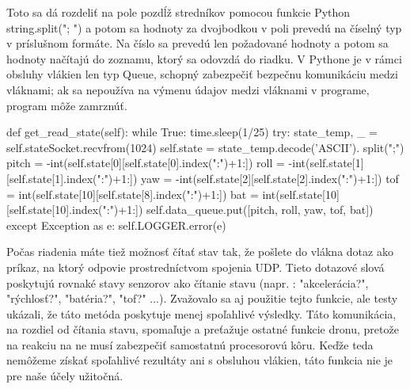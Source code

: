 {Toto sa dá rozdeliť na pole pozdĺž stredníkov pomocou funkcie Python string.split("; ") a potom sa hodnoty za dvojbodkou v poli prevedú na číselný typ v príslušnom formáte. Na číslo sa prevedú len požadované hodnoty a potom sa hodnoty načítajú do zoznamu, ktorý sa odovzdá do riadku. V Pythone je v rámci obsluhy vlákien len typ Queue, schopný zabezpečiť bezpečnu komunikáciu medzi vláknami; ak sa nepoužíva na výmenu údajov medzi vláknami v programe, program môže zamrznúť. 
\begin{mypython}[caption={Funkcia na čítanie stavov dronov },label=CL-2]
def get_read_state(self): 
    while True: 
        time.sleep(1/25) 
        try: 
            state_temp, _ = self.stateSocket.recvfrom(1024) 
            self.state = state_temp.decode('ASCII'). split(";") 
            pitch = -int(self.state[0][self.state[0].index(":")+1:]) 
            roll = -int(self.state[1][self.state[1].index(":")+1:]) 
            yaw = -int(self.state[2][self.state[2].index(":")+1:]) 
            tof = int(self.state[10][self.state[8].index(":")+1:]) 
            bat = int(self.state[10][self.state[10].index(":")+1:]) 
            self.data_queue.put([pitch, roll, yaw, tof, bat]) 
        except Exception as e: 
            self.LOGGER.error(e) 
\end{mypython} 
Počas riadenia máte tiež možnosť čítať stav tak, že pošlete do vlákna dotaz ako príkaz, na ktorý odpovie prostredníctvom spojenia UDP. Tieto dotazové slová poskytujú rovnaké stavy senzorov ako čítanie stavu (napr. : "akcelerácia?", "rýchlosť?", "batéria?", "tof?" ...). Zvažovalo sa aj použitie tejto funkcie, ale testy ukázali, že táto metóda poskytuje menej spoľahlivé výsledky. Táto komunikácia, na rozdiel od čítania stavu, spomaľuje a preťažuje ostatné funkcie dronu, pretože na reakciu na ne musí zabezpečiť samostatnú procesorovú kôru. Keďže teda nemôžeme získať spoľahlivé rezultáty ani s obsluhou vlákien, táto funkcia nie je pre naše účely užitočná. 

}
